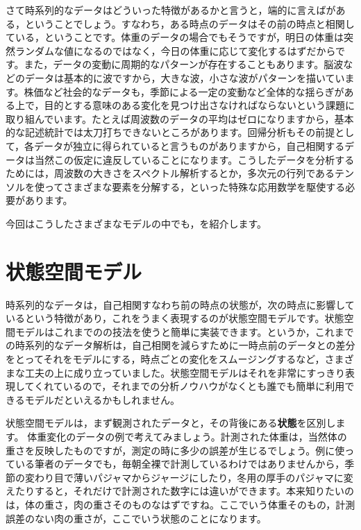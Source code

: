 \documentclass{ltjsbook}
\begin{document}
さて時系列的なデータはどういった特徴があるかと言うと，端的に言えばがある，ということでしょう。すなわち，ある時点のデータはその前の時点と相関している，ということです。体重のデータの場合でもそうですが，明日の体重は突然ランダムな値になるのではなく，今日の体重に応じて変化するはずだからです。また，データの変動に周期的なパターンが存在することもあります。脳波などのデータは基本的に波ですから，大きな波，小さな波がパターンを描いています。株価など社会的なデータも，季節による一定の変動など全体的な揺らぎがある上で，目的とする意味のある変化を見つけ出さなければならないという課題に取り組んでいます。たとえば周波数のデータの平均はゼロになりますから，基本的な記述統計では太刀打ちできないところがあります。回帰分析もその前提として，各データが独立に得られていると言うものがありますから，自己相関するデータは当然この仮定に違反していることになります。こうしたデータを分析するためには，周波数の大きさをスペクトル解析するとか，多次元の行列であるテンソルを使ってさまざまな要素を分解する，といった特殊な応用数学を駆使する必要があります。

今回はこうしたさまざまなモデルの中でも，を紹介します。
\section{状態空間モデル}
時系列的なデータは，自己相関すなわち前の時点の状態が，次の時点に影響しているという特徴があり，これをうまく表現するのが状態空間モデルです。状態空間モデルはこれまでのの技法を使うと簡単に実装できます。というか，これまでの時系列的なデータ解析は，自己相関を減らすために一時点前のデータとの差分をとってそれをモデルにする，時点ごとの変化をスムージングするなど，さまざまな工夫の上に成り立っていました。状態空間モデルはそれを非常にすっきり表現してくれているので，それまでの分析ノウハウがなくとも誰でも簡単に利用できるモデルだといえるかもしれません。

状態空間モデルは，まず観測されたデータと，その背後にある\textbf{状態}を区別します。
体重変化のデータの例で考えてみましょう。計測された体重は，当然体の重さを反映したものですが，測定の時に多少の誤差が生じるでしょう。例に使っている筆者のデータでも，毎朝全裸で計測しているわけではありませんから，季節の変わり目で薄いパジャマからジャージにしたり，冬用の厚手のパジャマに変えたりすると，それだけで計測された数字には違いができます。本来知りたいのは，体の重さ，肉の重さそのものなはずですね。ここでいう体重そのもの，計測誤差のない肉の重さが，ここでいう状態のことになります。
\end{document}
